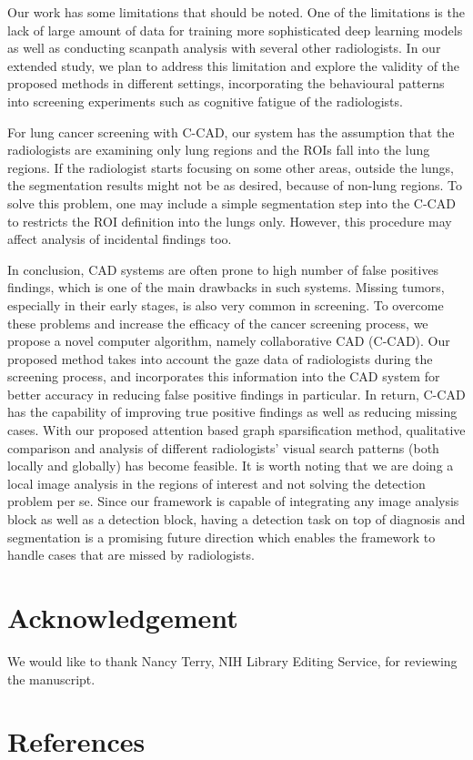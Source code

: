 \documentclass[preprint,12pt]{elsarticle}
\begin{document}
Our work has some limitations that should be noted. One of the limitations  is the lack of large amount of data for training more sophisticated deep learning models as well as conducting scanpath analysis with several other radiologists. In our extended study, we plan to address this limitation and explore the validity of the proposed methods in different settings, incorporating the behavioural patterns into screening experiments such as cognitive fatigue of the radiologists.


For lung cancer screening with C-CAD, our system has the assumption that the radiologists are examining only lung regions and the ROIs fall into the lung regions. If the radiologist starts focusing on some other areas, outside the lungs, the segmentation results might not be as desired, because of non-lung regions. To solve this problem, one may include a simple segmentation step into the C-CAD to restricts the ROI definition into the lungs only. However, this procedure may affect analysis of incidental findings too.






In conclusion, CAD systems are often prone to high number of false positives findings, which is one of the main drawbacks in such systems. Missing tumors, especially in their early stages, is also very common in screening. To overcome these problems and increase the efficacy of the cancer screening process, we propose a novel computer algorithm, namely collaborative CAD (C-CAD). Our proposed method takes into account the gaze data of radiologists during the screening process, and incorporates this information into the CAD system for better accuracy in reducing false positive findings in particular. In return, C-CAD has the capability of improving true positive findings as well as reducing missing cases.%
With our proposed attention based graph sparsification method, qualitative comparison and analysis of different radiologists' visual search patterns (both locally and globally) has become feasible. It is worth noting that we are doing a local image analysis in the regions of interest and not solving the detection problem per se. Since our framework is capable of integrating any image analysis block as well as a detection block, having a detection task on top of diagnosis and segmentation is a promising future direction which enables the framework to handle cases that are missed by radiologists.




\section*{Acknowledgement }
We would like to thank Nancy Terry, NIH Library Editing Service, for reviewing the manuscript.
\section*{References}

\end{document}
